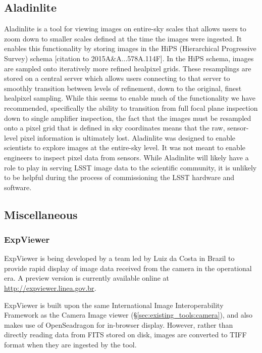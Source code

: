 \subsection{Aladinlite}

Aladinlite is a tool for viewing images on entire-sky scales that allows users
to zoom down to smaller scales defined at the time the images were ingested.
It enables this functionality by storing images in the HiPS (Hierarchical
Progressive Survey) schema [citation to 2015A\&A...578A.114F].  In the HiPS
schema, images are sampled onto iteratively more refined healpixel grids.  These
resamplings are stored on a central server which allows users connecting to that
server to smoothly transition between levels of refinement, down to the
original, finest healpixel sampling.  While this seems to enable much of the
functionality we have recommended, specifically the ability to transition from
full focal plane inspection down to single amplifier inspection, the fact that
the images must be resampled onto a pixel grid that is defined in sky
coordinates means that the raw, sensor-level pixel information is ultimately
lost.  Aladinlite was designed to enable scientists to explore images at the
entire-sky level.  It was not meant to enable engineers to inspect pixel data
from sensors.  While Aladinlite will likely have a role to play in serving LSST
image data to the scientific community, it is unlikely to be helpful during the
process of commissioning the LSST hardware and software.

\subsection{Miscellaneous}
\subsubsection{ExpViewer}
\label{sec:existing_tools:misc:expviewer}

ExpViewer is being developed by a team led by Luiz da Costa in Brazil to provide rapid display of image data received from the camera in the operational era.
A preview version is currently available online at \url{http://expviewer.linea.gov.br}.

ExpViewer is built upon the same International Image Interoperability Framework as the Camera Image viewer (\S\ref{sec:existing_tools:camera}), and also makes use of OpenSeadragon for in-browser display.
However, rather than directly reading data from FITS stored on disk, images are converted to TIFF format when they are ingested by the tool.

